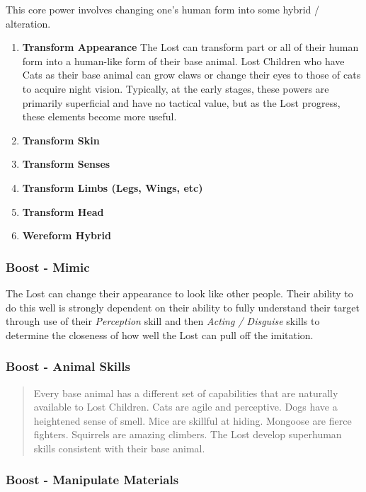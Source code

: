 \documentclass[letterpaper,serif]{rpg-module}
\begin{document}
This core power involves changing one's human form into some hybrid / alteration.

\begin{enumerate}
    \item \textbf{Transform Appearance} The Lost can transform part or all of their human form into a human-like form of their base animal. Lost Children who have Cats as their base animal can grow claws or change their eyes to those of cats to acquire night vision. Typically, at the early stages, these powers are primarily superficial and have no tactical value, but as the Lost progress, these elements become more useful. 
    
    \item \textbf{Transform Skin} 
	\item \textbf{Transform Senses}
	\item \textbf{Transform Limbs (Legs, Wings, etc)}
	\item \textbf{Transform Head}
	\item \textbf{Wereform Hybrid}
\end{enumerate}

\subsubsection{Boost - Mimic}
The Lost can change their appearance to look like other people. Their ability to do this well is strongly dependent on their ability to fully understand their target through use of their \textit{Perception} skill and then \textit{Acting / Disguise} skills to determine the closeness of how well the Lost can pull off the imitation. 

\subsubsection{Boost - Animal Skills}

\begin{quote}
Every base animal has a different set of capabilities that are naturally available to Lost Children. Cats are agile and perceptive. Dogs have a heightened sense of smell. Mice are skillful at hiding. Mongoose are fierce fighters. Squirrels are amazing climbers. The Lost develop superhuman skills consistent with their base animal. 
\end{quote}

\subsubsection{Boost - Manipulate Materials} 
\end{document}
